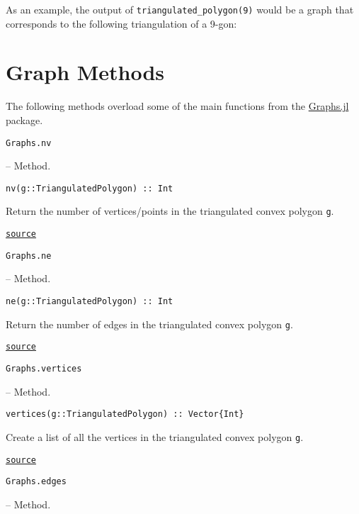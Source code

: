 As an example, the output of \texttt{triangulated\_polygon(9)} would be a graph that corresponds to the following triangulation of a 9-gon:





\section{Graph Methods}



\label{11321063701219043265}{}


The following methods overload some of the main functions from the \href{https://juliagraphs.org/Graphs.jl/stable/}{Graphs.jl} package.


\hypertarget{8167533972265480819}{\texttt{Graphs.nv}}  -- {Method.}

\begin{adjustwidth}{2em}{0pt}


\begin{verbatim}
nv(g::TriangulatedPolygon) :: Int
\end{verbatim}

Return the number of vertices/points in the triangulated convex polygon \texttt{g}.



\href{https://github.com/schto223/FlipGraphs.jl/blob/e35d43698a06b86273148826b79d585ba04fcd26/src/polygonTriangulations.jl#L111-L115}{\texttt{source}}


\end{adjustwidth}
\hypertarget{4124488593235871915}{\texttt{Graphs.ne}}  -- {Method.}

\begin{adjustwidth}{2em}{0pt}


\begin{verbatim}
ne(g::TriangulatedPolygon) :: Int
\end{verbatim}

Return the number of edges in the triangulated convex polygon \texttt{g}.



\href{https://github.com/schto223/FlipGraphs.jl/blob/e35d43698a06b86273148826b79d585ba04fcd26/src/polygonTriangulations.jl#L104-L108}{\texttt{source}}


\end{adjustwidth}
\hypertarget{2409708083507170643}{\texttt{Graphs.vertices}}  -- {Method.}

\begin{adjustwidth}{2em}{0pt}


\begin{verbatim}
vertices(g::TriangulatedPolygon) :: Vector{Int}
\end{verbatim}

Create a list of all the vertices in the triangulated convex polygon \texttt{g}.



\href{https://github.com/schto223/FlipGraphs.jl/blob/e35d43698a06b86273148826b79d585ba04fcd26/src/polygonTriangulations.jl#L118-L122}{\texttt{source}}


\end{adjustwidth}
\hypertarget{15968138045719588877}{\texttt{Graphs.edges}}  -- {Method.}

